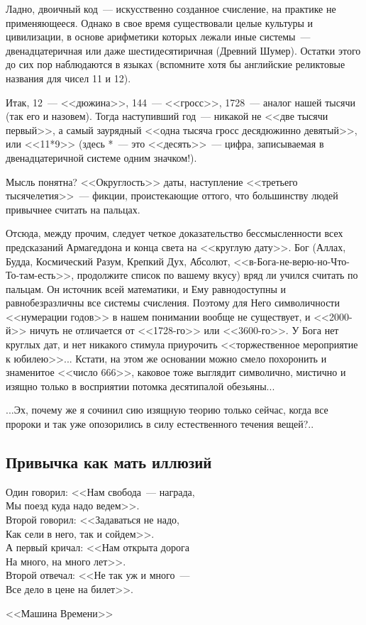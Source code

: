 \documentclass{scrbook}
\makeatletter
\newcommand{\bigepigraphwidth}{0.8} %
\newcommand{\defaultepigraphwidth}{0.5} %
\newcommand{\flqq}{<<}
\newcommand{\frqq}{>>}
\newcommand{\mdash}{~--- }
\newcommand{\essaysection}[1]{\subsection*{#1}\nopagebreak}
\newcommand{\myepigraph}[3][\@empty]{
	\ifx\@empty#1
		\setlength{\epigraphwidth}{\defaultepigraphwidth\textwidth}
	\else
		\setlength{\epigraphwidth}{#1\textwidth}
	\fi
	\epigraph{#2}{#3}
	\setlength{\epigraphwidth}{\defaultepigraphwidth\textwidth} %
	\nopagebreak
}
\makeatother
\begin{document}
Ладно, двоичный код{\mdash}искусственно созданное счисление, на практике не применяющееся. Однако в свое время существовали целые культуры и цивилизации, в основе арифметики которых лежали иные системы{\mdash}двенадцатеричная или даже шестидесятиричная (Древний Шумер). Остатки этого до сих пор наблюдаются в языках (вспомните хотя бы английские реликтовые названия для чисел 11 и 12).

Итак, 12{\mdash}{\flqq}дюжина{\frqq}, 144{\mdash}{\flqq}гросс{\frqq}, 1728{\mdash}аналог нашей тысячи (так его и назовем). Тогда наступивший год{\mdash}никакой не {\flqq}две тысячи первый{\frqq}, а самый заурядный {\flqq}одна тысяча гросс десядюжинно девятый{\frqq}, или {\flqq}11*9{\frqq} (здесь *{\mdash}это {\flqq}десять{\frqq}{\mdash}цифра, записываемая в двенадцатеричной системе одним значком!).

Мысль понятна? {\flqq}Округлость{\frqq} даты, наступление {\flqq}третьего тысячелетия{\frqq}{\mdash}фикции, проистекающие оттого, что большинству людей привычнее считать на пальцах.

Отсюда, между прочим, следует четкое доказательство бессмысленности всех предсказаний Армагеддона и конца света на {\flqq}круглую дату{\frqq}. Бог (Аллах, Будда, Космический Разум, Крепкий Дух, Абсолют, {\flqq}в-Бога-не-верю-но-Что-То-там-есть{\frqq}, продолжите список по вашему вкусу) вряд ли учился считать по пальцам. Он источник всей математики, и Ему равнодоступны и равнобезразличны все системы счисления. Поэтому для Него символичности {\flqq}нумерации годов{\frqq} в нашем понимании вообще не существует, и {\flqq}2000-й{\frqq} ничуть не отличается от {\flqq}1728-го{\frqq} или {\flqq}3600-го{\frqq}. У Бога нет круглых дат, и нет никакого стимула приурочить {\flqq}торжественное мероприятие к юбилею{\frqq}... Кстати, на этом же основании можно смело похоронить и знаменитое {\flqq}число 666{\frqq}, каковое тоже выглядит символично, мистично и изящно только в восприятии потомка десятипалой обезьяны...

...Эх, почему же я сочинил сию изящную теорию только сейчас, когда все пророки и так уже опозорились в силу естественного течения вещей?..

\essaysection{Привычка как мать иллюзий}

\myepigraph[\bigepigraphwidth]{Один говорил: {\flqq}Нам свобода{\mdash}награда, \\
Мы поезд куда надо ведем{\frqq}. \\
Второй говорил: {\flqq}Задаваться не надо, \\
Как сели в него, так и сойдем{\frqq}. \\
А первый кричал: {\flqq}Нам открыта дорога \\
На много, на много лет{\frqq}. \\
Второй отвечал: {\flqq}Не так уж и много{\mdash}\\
Все дело в цене на билет{\frqq}.}
{{\flqq}Машина Времени{\frqq}}
\end{document}
